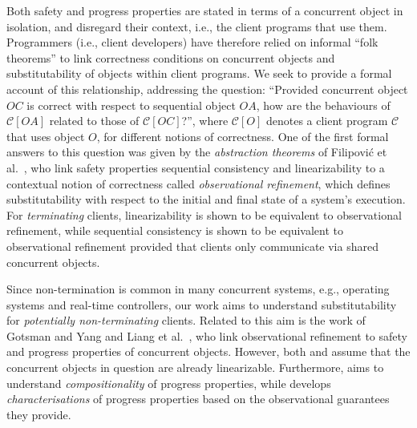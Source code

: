 \documentclass[11pt]{llncs}
\newcommand{\mcC}{\mathcal{C}}
\begin{document}
Both safety and progress properties are stated in terms of a
concurrent object in isolation, and disregard their context, i.e., the
client programs that use them.  Programmers (i.e., client developers)
have therefore relied on informal ``folk theorems'' to link
correctness conditions on concurrent objects and substitutability of
objects within client programs.  We seek to provide a formal account
of this relationship, addressing the question: ``Provided concurrent
object $OC$ is correct with respect to sequential object $OA$, how are
the behaviours of $\mcC[OA]$ related to those of $\mcC[OC]$?'', where
$\mcC[O]$ denotes a client program $\mcC$ that uses object $O$, for
different notions of correctness.  One of the first formal answers to
this question was given by the \emph{abstraction theorems} of
Filipovi\'c et al.\ \cite{FORY10}, who link safety properties
sequential consistency and linearizability to a contextual notion of
correctness called \emph{observational refinement}, which defines
substitutability with respect to the initial and final state of a
system's
execution. For \emph{terminating} clients, linearizability is
shown to be equivalent to observational refinement, while sequential
consistency is shown to be equivalent to observational refinement provided
that clients only communicate via shared concurrent objects.

Since non-termination is common in many concurrent systems, e.g.,
operating systems and real-time controllers, our work aims to
understand substitutability for \emph{potentially non-terminating}
clients.  Related to this aim is the work of Gotsman and Yang
\cite{GY11} and Liang et al.\ \cite{LiangHFS13}, who link
observational refinement to safety and progress properties of
concurrent objects.
However, both \cite{GY11} and \cite{LiangHFS13} assume that the
concurrent objects in question are already linearizable. Furthermore,
\cite{GY11} aims to understand \emph{compositionality} of progress
properties, while \cite{LiangHFS13} develops \emph{characterisations}
of progress properties based on the observational guarantees they
provide.
\end{document}
